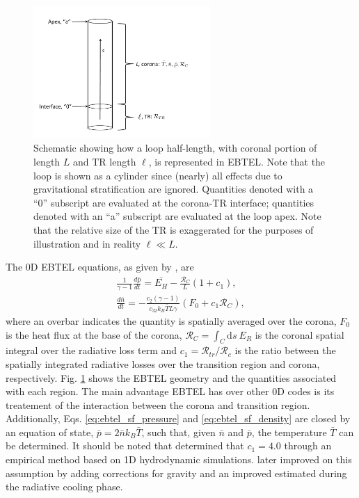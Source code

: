 \begin{figure}
	\centering
	\includegraphics[width=0.6\textwidth]{figures/ebtel_schematic.pdf}
	\caption{Schematic showing how a loop half-length, with coronal portion of length $L$ and TR length $\ell$, is represented in EBTEL. Note that the loop is shown as a cylinder since (nearly) all effects due to gravitational stratification are ignored. Quantities denoted with a ``0'' subscript are evaluated at the corona-TR interface; quantities denoted with an ``a'' subscript are evaluated at the loop apex. Note that the relative size of the TR is exaggerated for the purposes of illustration and in reality $\ell\ll L$.}
	\label{fig:ebtel_schematic}
\end{figure}
%
\par The 0D EBTEL equations, as given by \citet{cargill_enthalpy-based_2012}, are
\begin{align}
	\frac{1}{\gamma - 1}\frac{d\bar{p}}{dt} = \bar{E_H} - \frac{\mathcal{R}_C}{L}(1+c_1), \label{eq:ebtel_sf_pressure} \\[0.5em]
	\frac{d\bar{n}}{dt} = -\frac{c_2(\gamma - 1)}{c_32k_B\bar{T}L\gamma}(F_0 + c_1\mathcal{R}_C), \label{eq:ebtel_sf_density}
\end{align}
where an overbar indicates the quantity is spatially averaged over the corona, $F_0$ is the heat flux at the base of the corona, $\mathcal{R}_C=\int_C\mathrm{d}s~E_R$ is the coronal spatial integral over the radiative loss term and $c_1=\mathcal{R}_{tr}/\mathcal{R}_c$ is the ratio between the spatially integrated radiative losses over the transition region and corona, respectively. Fig. \ref{fig:ebtel_schematic} shows the EBTEL geometry and the quantities associated with each region. The main advantage EBTEL has over other 0D codes is its treatement of the interaction between the corona and transition region. Additionally, Eqs. \ref{eq:ebtel_sf_pressure} and \ref{eq:ebtel_sf_density} are closed by an equation of state, $\bar{p}=2\bar{n}k_B\bar{T}$, such that, given $\bar{n}$ and $\bar{p}$, the temperature $\bar{T}$ can be determined. It should be noted that \citet{klimchuk_highly_2008} determined that $c_1=4.0$ through an empirical method based on 1D hydrodynamic simulations. \citet{cargill_enthalpy-based_2012} later improved on this assumption by adding corrections for gravity and an improved estimated during the radiative cooling phase.
